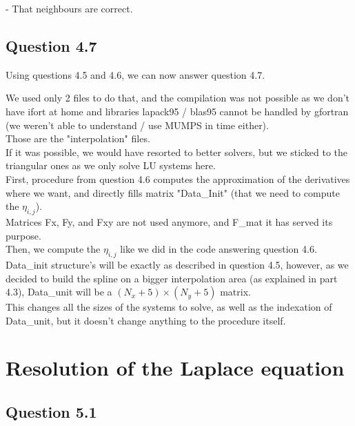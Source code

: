 \documentclass[10pt]{article}
\begin{document}
- That neighbours are correct.


\subsection{Question 4.7}

Using questions 4.5 and 4.6, we can now answer question 4.7.

We used only 2 files to do that, and the compilation was not possible as we don't have ifort at home and libraries lapack95 / blas95
cannot be handled by gfortran (we weren't able to understand / use MUMPS in time either).\\

Those are the "interpolation" files.\\

If it was possible, we would have resorted to better solvers, but we sticked to the triangular ones as we only solve LU systems here.\\

First, procedure from question 4.6 computes the approximation of the derivatives where we want, and directly fills matrix "Data\_Init" (that we need to compute the $\eta_{i,j}$).\\
Matrices Fx, Fy, and Fxy are not used anymore, and F\_mat it has served its purpose.\\

Then, we compute the $\eta_{i,j}$ like we did in the code answering question 4.6.\\

Data\_init structure's will be exactly as described in question 4.5, however, as we decided to build the spline on a bigger interpolation area (as explained in part 4.3), Data\_unit will be a $(N_x+5) \times (N_y+5)$ matrix.\\

This changes all the sizes of the systems to solve, as well as the indexation of Data\_unit, but it doesn't change anything to the procedure itself.


\newpage


\section{Resolution of the Laplace equation}


\subsection{Question 5.1}
\end{document}

